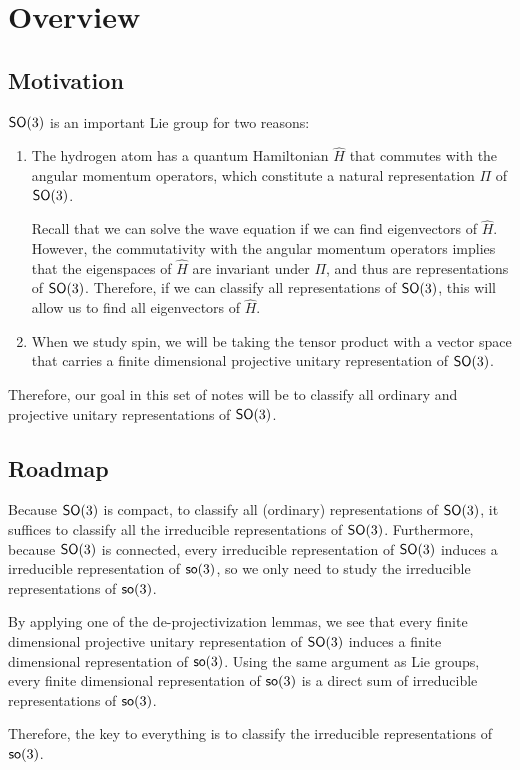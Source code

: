 \section{Overview}
\subsection{Motivation}
$\operatorname{\textsf{SO}}(3)$ is an important Lie group for two reasons:
\begin{enumerate}
    \item The hydrogen atom has a quantum Hamiltonian $\hat{H}$ that commutes with the angular momentum operators, which constitute a natural representation $\Pi$ of $\operatorname{\textsf{SO}}(3)$.

    Recall that we can solve the wave equation if we can find eigenvectors of $\hat{H}$. However, the commutativity with the angular momentum operators implies that the eigenspaces of $\hat{H}$ are invariant under $\Pi$, and thus are representations of $\operatorname{\textsf{SO}}(3)$. Therefore, if we can classify all representations of $\operatorname{\textsf{SO}}(3)$, this will allow us to find all eigenvectors of $\hat{H}$.

    \item  When we study spin, we will be taking the tensor product with a vector space that carries a finite dimensional projective unitary representation of $\operatorname{\textsf{SO}}(3)$.
\end{enumerate}
Therefore, our goal in this set of notes will be to classify all ordinary and projective unitary representations of $\operatorname{\textsf{SO}}(3)$.

\subsection{Roadmap}
Because $\operatorname{\textsf{SO}}(3)$ is compact, to classify all (ordinary) representations of $\operatorname{\textsf{SO}}(3)$, it suffices to classify all the irreducible representations of $\operatorname{\textsf{SO}}(3)$. Furthermore, because $\operatorname{\textsf{SO}}(3)$ is connected, every irreducible representation of $\operatorname{\textsf{SO}}(3)$ induces a irreducible representation of $\operatorname{\textsf{so}}(3)$, so we only need to study the irreducible representations of $\operatorname{\textsf{so}}(3)$.

By applying one of the de-projectivization lemmas, we see that every finite dimensional projective unitary representation of $\operatorname{\textsf{SO}}(3)$ induces a finite dimensional representation of $\operatorname{\textsf{so}}(3)$. Using the same argument as Lie groups, every finite dimensional representation of $\operatorname{\textsf{so}}(3)$ is a direct sum of irreducible representations of $\operatorname{\textsf{so}}(3)$.

Therefore, the key to everything is to classify the irreducible representations of $\operatorname{\textsf{so}}(3)$. 
